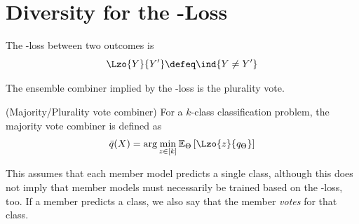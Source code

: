 \documentclass[../main.tex]{subfiles}
\begin{document}







\section{Diversity for the \zeroone-Loss}
\label{sec:diversity-zeroone}

\begin{definition}
\label{def:zeroone-loss}
The \zeroone-loss between two outcomes is 
$$
\Lzo{Y}{Y'} \defeq \ind{Y \not= Y'}
$$
\end{definition}

The ensemble combiner implied by the \zeroone-loss is the plurality vote.
\begin{definition} 
   \label{def:majority-vote} 
    (Majority/Plurality vote combiner) For a $k$-class classification problem, the majority vote combiner is defined as
$$
\bar{q}(X) = \arg\min_{z \in [k]} \mathbb{E}_{\Theta}\left[ \Lzo{z}{q_{\Theta}} \right]  
$$
\end{definition}
This assumes that each member model predicts a single class, although this does not imply that member models must necessarily be trained based on the \zeroone-loss, too. If a member predicts a class, we also say that the member \textit{votes} for that class.
\end{document}
